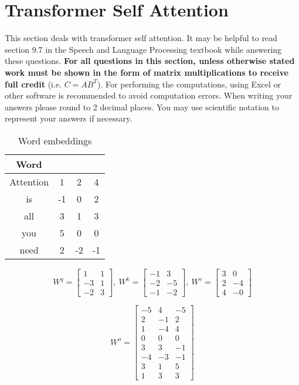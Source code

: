 \documentclass[12pt, letterpaper]{article}
\begin{document}
\section{Transformer Self Attention}
This section deals with transformer self attention. It may be helpful to read section 9.7 in the Speech and Language Processing textbook while answering these questions. \textbf{For all questions in this section, unless otherwise stated work must be shown in the form of matrix multiplications to receive full credit} (i.e. $C = AB^T$). For performing the computations, using Excel or other software is recommended to avoid computation errors. When writing your answers please round to 2 decimal places. You may use scientific notation to represent your answers if necessary.
\begin{enumerate}

\begin{table}[H]
\begin{center}
\begin{tabular}{ |c|c|c|c| } 
\hline
 Word &  \multicolumn{3}{c|}{}   \\
\hline
Attention & 1  & 2  & 4  \\
is        & -1  & 0  & 2  \\
all       & 3   & 1  & 3  \\
you       & 5   & 0  & 0  \\
need      & 2   & -2 & -1 \\
\hline
\end{tabular}
\caption{Word embeddings}
\end{center}
\end{table}

\[
W^q = 
\begin{bmatrix}
    1   &  1      \\
    -3  &  1      \\
    -2  &  3      
\end{bmatrix}
,\ W^k = 
\begin{bmatrix}
    -1  &  3      \\
    -2  &  -5      \\
    -1  &  -2      
\end{bmatrix}
,\ W^v = 
\begin{bmatrix}
    3  &  0      \\
    2  &  -4      \\
    4  &  -0      
\end{bmatrix} 
\]

\[
W^o = 
\begin{bmatrix}
     -5  &  4    &  -5  \\
     2   &  -1   &  2   \\
     1   &  -4   &  4   \\
     0   &  0    &  0   \\
     3   &  3    &  -1  \\
     -4  &  -3   &  -1  \\
     3   &  1    &  5   \\
     1   &  3    &  3  
\end{bmatrix}
\]



\end{enumerate}
\end{document}
